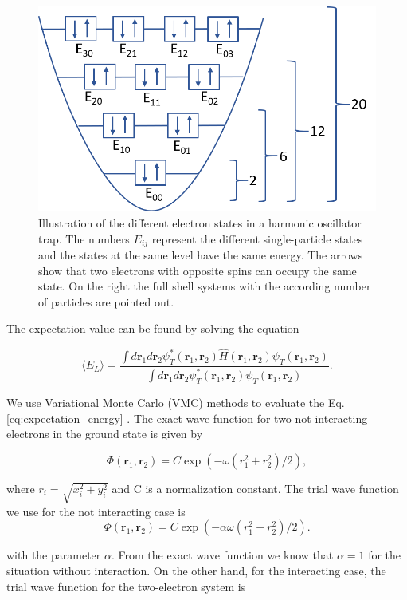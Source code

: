 \begin{figure}[H]
\center
\includegraphics[width=0.6\linewidth]{../Results/states}\caption{Illustration of the different electron states in a harmonic oscillator trap. The numbers $E_{ij}$ represent the different single-particle states and the states at the same level have the same energy. The arrows show that two electrons with opposite spins can occupy the same state. On the right the full shell systems with the according number of particles are pointed out.}\label{fig:states}
\end{figure}

The expectation value can be found by solving the equation

\begin{equation}\label{eq:expectation_energy}
   \langle E_L \rangle =
   \frac{\int d\bm{r}_1d\bm{r}_2\psi^{\ast}_T(\bm{r}_1,\bm{r}_2)\hat{H}(\bm{r}_1,\bm{r}_2)\psi_T(\bm{r}_1,\bm{r}_2)}
        {\int d\bm{r}_1d\bm{r}_2\psi^{\ast}_T(\bm{r}_1,\bm{r}_2)\psi_T(\bm{r}_1,\bm{r}_2)}.
\end{equation}

We use Variational Monte Carlo (VMC) methods to evaluate the Eq. \ref{eq:expectation_energy} \cite{project1}. The exact wave function for two not interacting electrons in the ground state is given by

\begin{equation*}
\Phi(\bm{r}_1,\bm{r}_2) = C\exp{\left(-\omega(r_1^2+r_2^2)/2\right)},
\end{equation*}

where $r_i = \sqrt{x_i^2+y_i^2}$ and C is a normalization constant. The trial wave function we use for the not interacting case is 
\begin{equation}\label{eq:trial_wf_not_interacing}
\Phi(\bm{r}_1,\bm{r}_2) = C\exp{\left(-\alpha\omega(r_1^2+r_2^2)/2\right)}.
\end{equation}

with the parameter $\alpha$. From the exact wave function we know that $\alpha = 1$ for the situation without interaction. On the other hand, for the interacting case, the trial wave function for the two-electron system is

